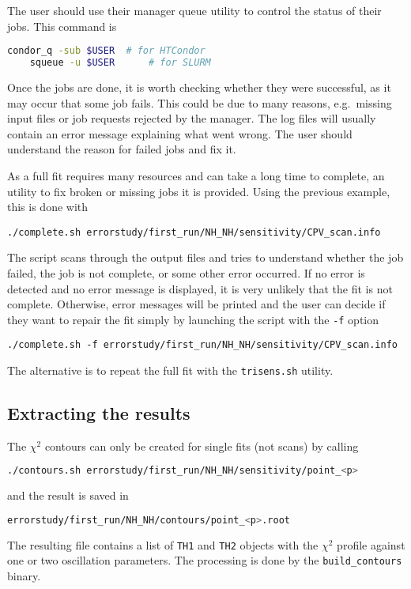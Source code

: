 \documentclass[a4paper, 11pt]{article}
\begin{document}
The user should use their manager queue utility to control the status of their jobs.
This command is
\begin{lstlisting}[language=bash]
	condor_q -sub $USER  # for HTCondor
	squeue -u $USER      # for SLURM
\end{lstlisting}
Once the jobs are done, it is worth checking whether they were successful, %
as it may occur that some job fails.
This could be due to many reasons, e.g.\ missing input files or job requests rejected by the manager.
The log files will usually contain an error message explaining what went wrong.
The user should understand the reason for failed jobs and fix it.

As a full fit requires many resources and can take a long time to complete, %
an utility to fix broken or missing jobs it is provided.
Using the previous example, this is done with
\begin{lstlisting}[]
	./complete.sh errorstudy/first_run/NH_NH/sensitivity/CPV_scan.info
\end{lstlisting}
The script scans through the output files and tries to understand whether the job failed, the job is not complete, or some other error occurred.
If no error is detected and no error message is displayed, it is very unlikely that the fit is not complete.
Otherwise, error messages will be printed and the user can decide if they want to repair the fit %
simply by launching the script with the \texttt{-f} option
\begin{lstlisting}[]
	./complete.sh -f errorstudy/first_run/NH_NH/sensitivity/CPV_scan.info
\end{lstlisting}
The alternative is to repeat the full fit with the \texttt{trisens.sh} utility.

\subsection{Extracting the results}

The $\chi^2$ contours can only be created for single fits (not scans) by calling
\begin{lstlisting}[language=bash]
	./contours.sh errorstudy/first_run/NH_NH/sensitivity/point_<p>
\end{lstlisting}
and the result is saved in 
\begin{lstlisting}[language=bash]
	errorstudy/first_run/NH_NH/contours/point_<p>.root
\end{lstlisting}
The resulting file contains a list of \texttt{TH1} and \texttt{TH2} objects with the %
$\chi^2$ profile against one or two oscillation parameters.
The processing is done by the \texttt{build\_contours} binary.
\end{document}
